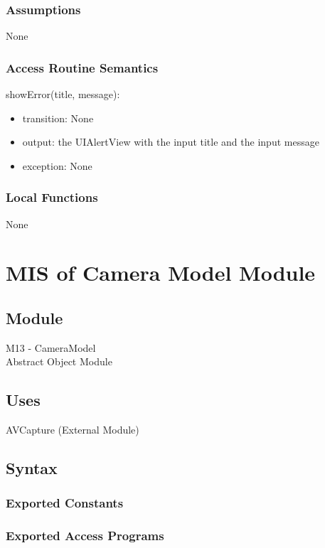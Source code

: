 \documentclass[12pt, titlepage]{article}
\begin{document}
\subsubsection{Assumptions}
None

\subsubsection{Access Routine Semantics}

\noindent showError(title, message):
\begin{itemize}
\item transition: None 
\item output: the UIAlertView with the input title and the input message 
\item exception: None
\end{itemize}

\subsubsection{Local Functions}
None

\newpage
\section{MIS of Camera Model Module}
\subsection{Module}
M13 - CameraModel\\
Abstract Object Module

\subsection{Uses}
AVCapture (External Module)\\

\subsection{Syntax}

\subsubsection{Exported Constants}

\subsubsection{Exported Access Programs}
\end{document}
